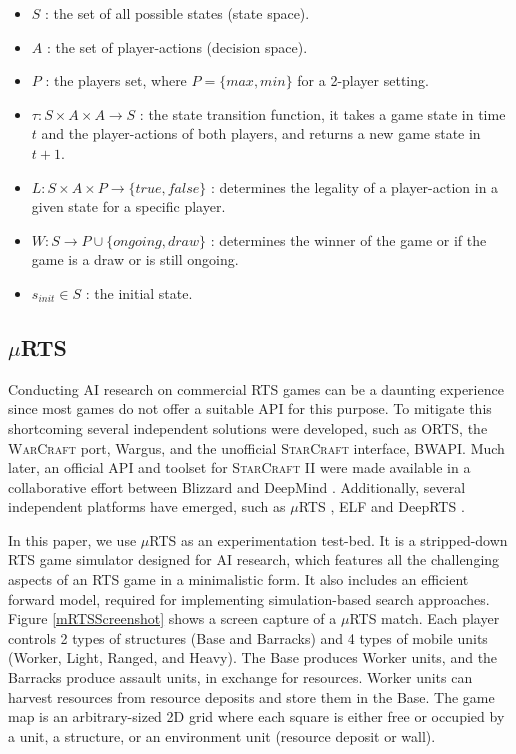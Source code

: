 \documentclass[conference]{IEEEtran}
\newcommand{\mRTS}{$\mu$RTS}
\begin{document}
\begin{itemize}
\item $S$ : the set of all possible states (state space).
\item $A$ : the set of player-actions (decision space).
\item $P$ : the players set, where $P=\{max,min\}$ for a 2-player setting.
\item $\tau : S \times A \times A \rightarrow S$ : the state transition function, it takes a game state in time $t$ and the player-actions of both players, and returns a new game state in $t+1$.
\item $L: S \times A \times P \rightarrow \{true,false\}$ : determines the legality of a player-action in a given state for a specific player.
\item $W: S \rightarrow P \cup \{ongoing,draw\}$ : determines the winner of the game or if the game is a draw or is still ongoing.
\item $s_{init} \in S$ : the initial state.
\end{itemize}


\subsection{\mRTS{}}

Conducting AI research on commercial RTS games can be a daunting experience since most games do not offer a suitable API for this purpose. To mitigate this shortcoming several independent solutions were developed, such as ORTS, the \textsc{WarCraft} port, Wargus, and the unofficial \textsc{StarCraft} interface, BWAPI. Much later, an official API and toolset for \textsc{StarCraft II} were made available in a collaborative effort between Blizzard and DeepMind \cite{vinyals_starcraft_2017-1}. Additionally, several independent platforms have emerged, such as \mRTS{} \cite{ontanon_combinatorial_2013}, ELF \cite{tian_elf:_2017} and DeepRTS \cite{andersen_deep_2018}.

In this paper, we use \mRTS{} as an experimentation test-bed. It is a stripped-down RTS game simulator designed for AI research, which features all the challenging aspects of an RTS game in a minimalistic form. It also includes an efficient forward model, required for implementing simulation-based search approaches. Figure \ref{mRTSScreenshot} shows a screen capture of a \mRTS{} match. Each player controls 2 types of structures (Base and Barracks) and 4 types of mobile units (Worker, Light, Ranged, and Heavy). The Base produces Worker units, and the Barracks produce assault units, in exchange for resources. Worker units can harvest resources from resource deposits and store them in the Base. The game map is an arbitrary-sized 2D grid where each square is either free or occupied by a unit, a structure, or an environment unit (resource deposit or wall).
\end{document}
